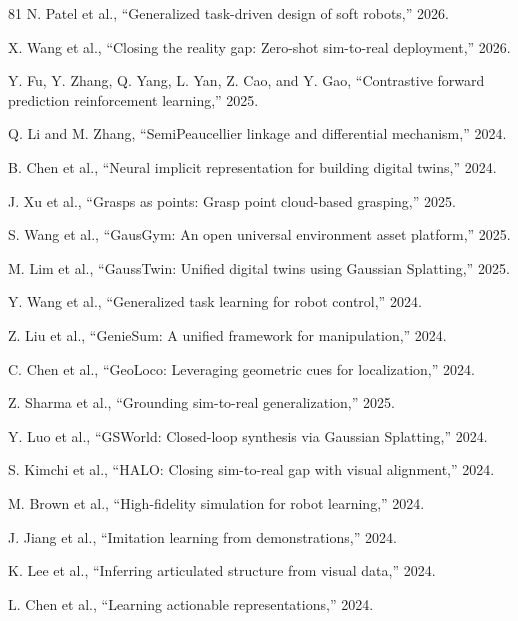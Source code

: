 \documentclass[journal]{IEEEtran}
\begin{document}
\begin{thebibliography}{81}
 N. Patel et al., ``Generalized task-driven design of soft robots,'' 2026.

 X. Wang et al., ``Closing the reality gap: Zero-shot sim-to-real deployment,'' 2026.

 Y. Fu, Y. Zhang, Q. Yang, L. Yan, Z. Cao, and Y. Gao, ``Contrastive forward prediction reinforcement learning,'' 2025.

 Q. Li and M. Zhang, ``SemiPeaucellier linkage and differential mechanism,'' 2024.

 B. Chen et al., ``Neural implicit representation for building digital twins,'' 2024.

 J. Xu et al., ``Grasps as points: Grasp point cloud-based grasping,'' 2025.

 S. Wang et al., ``GausGym: An open universal environment asset platform,'' 2025.

 M. Lim et al., ``GaussTwin: Unified digital twins using Gaussian Splatting,'' 2025.

 Y. Wang et al., ``Generalized task learning for robot control,'' 2024.

 Z. Liu et al., ``GenieSum: A unified framework for manipulation,'' 2024.

 C. Chen et al., ``GeoLoco: Leveraging geometric cues for localization,'' 2024.

 Z. Sharma et al., ``Grounding sim-to-real generalization,'' 2025.

 Y. Luo et al., ``GSWorld: Closed-loop synthesis via Gaussian Splatting,'' 2024.

 S. Kimchi et al., ``HALO: Closing sim-to-real gap with visual alignment,'' 2024.

 M. Brown et al., ``High-fidelity simulation for robot learning,'' 2024.

 J. Jiang et al., ``Imitation learning from demonstrations,'' 2024.

 K. Lee et al., ``Inferring articulated structure from visual data,'' 2024.

 L. Chen et al., ``Learning actionable representations,'' 2024.


\end{thebibliography}
\end{document}
